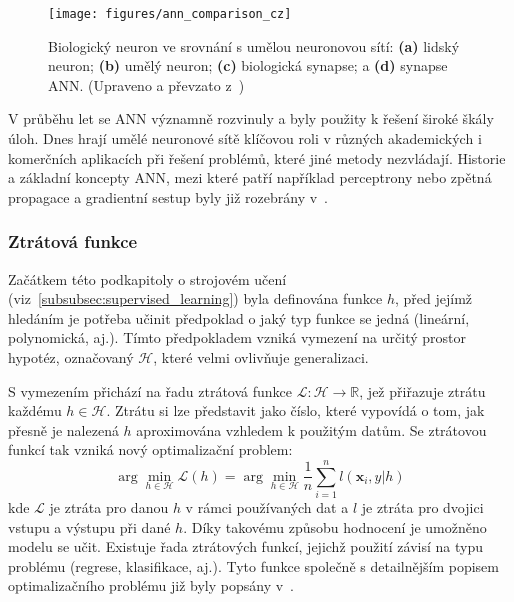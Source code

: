 \begin{figure}[!htb]
    \begin{center}
        \texttt{[image: figures/ann\_comparison\_cz]}
        \caption{Biologický neuron ve srovnání s umělou neuronovou sítí: \textbf{(a)}
            lidský neuron; \textbf{(b)} umělý neuron; \textbf{(c)} biologická
            synapse; a \textbf{(d)} synapse ANN. (Upraveno a převzato
            z~\cite{suzuki2013})}
        \label{fig:ann_comparison}
    \end{center}
\end{figure}

V průběhu let se \gls{ANN} významně rozvinuly a byly použity k řešení široké
škály úloh. Dnes hrají umělé neuronové sítě klíčovou roli v různých akademických
i komerčních aplikacích při řešení problémů, které jiné metody nezvládají.
Historie a základní koncepty \gls{ANN}, mezi které patří například perceptrony
nebo zpětná propagace a gradientní sestup byly již rozebrány
v~\cite{Aurelien2022,Murphy2012,Goodfellow2016}.

\subsubsection{Ztrátová funkce}
Začátkem této podkapitoly o strojovém učení
(viz~\ref{subsubsec:supervised_learning}) byla definována funkce $h$, před
jejímž hledáním je potřeba učinit předpoklad o jaký typ funkce se jedná
(lineární, polynomická, aj.). Tímto předpokladem vzniká vymezení na určitý
prostor hypotéz, označovaný $\mathcal{H}$, které velmi ovlivňuje generalizaci.

S vymezením přichází na řadu ztrátová funkce $\mathcal{L}:\mathcal{H}
    \rightarrow \mathbb{R}$, jež přiřazuje ztrátu každému $h \in \mathcal{H}$.
    Ztrátu si lze představit jako číslo, které vypovídá o tom, jak přesně je
    nalezená $h$ aproximována vzhledem k použitým datům. Se ztrátovou funkcí tak
    vzniká nový optimalizační problem:
\begin{equation}
    \arg\min_{h \in \mathcal{H}} \mathcal{L}(h) = \arg\min_{h \in \mathcal{H}} \frac{1}{n}\sum_{i=1}^nl(\textbf{x}_i,y|h)
\end{equation}
kde $\mathcal{L}$ je ztráta pro danou $h$ v rámci používaných dat a $l$ je
ztráta pro dvojici vstupu a výstupu při dané $h$. Díky takovému způsobu
hodnocení je umožněno modelu se učit. Existuje řada ztrátových funkcí, jejichž
použití závisí na typu problému (regrese, klasifikace, aj.). Tyto funkce
společně s detailnějším popisem optimalizačního problému již byly popsány
v~\cite{Murphy2012}.

